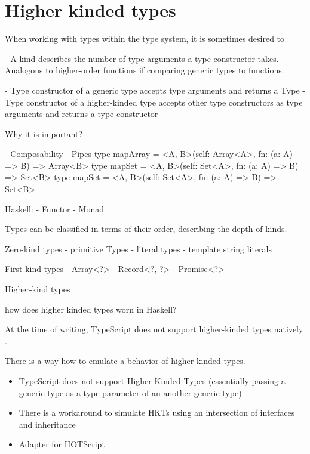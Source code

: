 \section{Higher kinded types}

When working with types within the type system, it is sometimes desired to 

- A kind describes the number of type arguments a type constructor takes. 
- Analogous to higher-order functions if comparing generic types to functions.

- Type constructor of a generic type accepts type arguments and returns a Type
- Type constructor of a higher-kinded type accepts other type constructors as type arguments and returns a type constructor

Why it is important?

- Composability 
- Pipes 
type mapArray = <A, B>(self: Array<A>, fn: (a: A) => B) => Array<B>
type mapSet = <A, B>(self: Set<A>, fn: (a: A) => B) => Set<B>
type mapSet = <A, B>(self: Set<A>, fn: (a: A) => B) => Set<B>

Haskell:
- Functor
- Monad


Types can be classified in terms of their order, describing the depth of kinds.

Zero-kind types
- primitive Types
- literal types 
- template string literals

First-kind types
- Array<?>
- Record<?, ?>
- Promise<?>

Higher-kind types


how does higher kinded types worn in Haskell?

At the time of writing, TypeScript does not support higher-kinded types natively \cite{DocumentationTypeScriptFunctional}. 

There is a way how to emulate a behavior of higher-kinded types. 



\begin{itemize}
  \item TypeScript does not support Higher Kinded Types (essentially passing a generic type as a type parameter of an another generic type)
  \item There is a workaround to simulate HKTs using an intersection of interfaces and inheritance
  \item Adapter for HOTScript
\end{itemize}